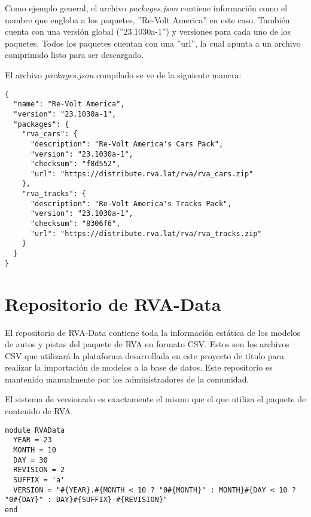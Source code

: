 Como ejemplo general, el archivo \textit{packages.json} contiene información como el nombre que engloba a los paquetes, ''Re-Volt America'' en este caso. También cuenta con una versión global (''23.1030a-1'') y versiones para cada uno de los paquetes. Todos los paquetes cuentan con una ''url'', la cual apunta a un archivo comprimido listo para ser descargado.

El archivo \textit{packages.json} compilado se ve de la siguiente manera:

\begin{longlisting}
  \begin{verbatim}  
{
  "name": "Re-Volt America",
  "version": "23.1030a-1",
  "packages": {
    "rva_cars": {
      "description": "Re-Volt America's Cars Pack",
      "version": "23.1030a-1",
      "checksum": "f8d552",
      "url": "https://distribute.rva.lat/rva/rva_cars.zip"
    },
    "rva_tracks": {
      "description": "Re-Volt America's Tracks Pack",
      "version": "23.1030a-1",
      "checksum": "8306f6",
      "url": "https://distribute.rva.lat/rva/rva_tracks.zip"
    }
  }
}
  \end{verbatim}
\end{longlisting}

\newpage

\section{Repositorio de RVA-Data}
El repositorio de RVA-Data contiene toda la información estática de los modelos de autos y pistas del paquete de RVA en formato CSV. Estos son los archivos CSV que utilizará la plataforma desarrollada en este proyecto de título para realizar la importación de modelos a la base de datos. Este repositorio es mantenido manualmente por los administradores de la comunidad.

El sistema de versionado es exactamente el mismo que el que utiliza el paquete de contenido de RVA.

\begin{longlisting}
  \begin{verbatim}  
module RVAData
  YEAR = 23
  MONTH = 10
  DAY = 30
  REVISION = 2
  SUFFIX = 'a'
  VERSION = "#{YEAR}.#{MONTH < 10 ? "0#{MONTH}" : MONTH}#{DAY < 10 ? "0#{DAY}" : DAY}#{SUFFIX}-#{REVISION}"
end
  \end{verbatim}
\end{longlisting}


